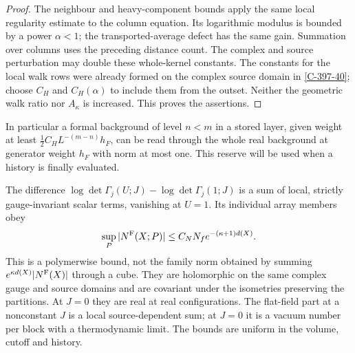 \documentclass[11pt,letterpaper,reqno]{amsart}
\makeatletter
\theoremstyle{definition}
\newcommand{\ms@minorstart}{%
  \pushQED{\qed}\renewcommand{\qedsymbol}{$\blacksquare$}}
\newenvironment{proposition}[1][]{\ms@minorstart\ms@proposition[#1]}
  {\popQED\endms@proposition}
\theoremstyle{remark}
\makeatother
\begin{document}
\begin{proof}
The neighbour and heavy-component bounds apply the
same local regularity estimate to the column equation.
Its logarithmic modulus is bounded by a power
$\alpha<1$; the transported-average defect has the
same gain.  Summation over columns uses the preceding
distance count.  The complex and source perturbation
may double these whole-kernel constants.  The constants
for the local walk rows were already formed on the
complex source domain in \cref{C-397-40}; choose $C_H$
and $C_H(\alpha)$ to include them from the outset.
Neither the geometric walk ratio nor $A_\kappa$ is
increased.  This proves the assertions.
\end{proof}

In particular a formal background of level $n<m$ in a
stored layer, given weight at least
$\frac12C_HL^{-(m-n)}h_F$, can be read through the
whole real background at generator weight $h_F$ with
norm at most one.  This reserve will be used when a
history is finally evaluated.

\begin{proposition}[Closed-walk expansion]\label{C-397-42}
The difference $\log\det\Gamma_j(U;J)-\log\det\Gamma_j(1;J)$
is a sum of local, strictly gauge-invariant scalar terms, vanishing
at $U=1$. Its individual array members obey
\[
 \sup_P|N^{\rm F}(X;P)|\le C_NN_f e^{-(\kappa+1)d(X)}.
\]
This is a polymerwise bound, not the family norm obtained
by summing $e^{\kappa d(X)}|N^{\rm F}(X)|$ through a cube.
They are holomorphic on the same
complex gauge and source domains and are covariant under the
isometries preserving the partitions. At $J=0$ they are real at
real configurations. The flat-field part at a nonconstant $J$ is
a local source-dependent sum; at $J=0$ it is a vacuum number per
block with a thermodynamic limit. The bounds are uniform in the
volume, cutoff and history.
\end{proposition}
\end{document}
